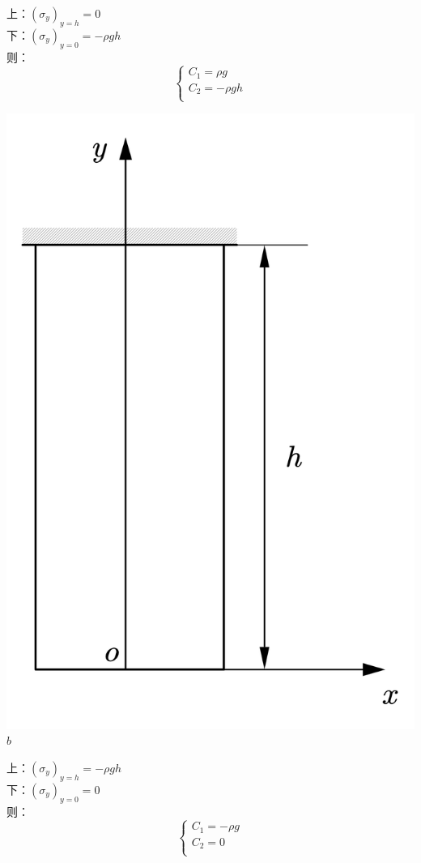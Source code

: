 \begin{center}
\begin{minipage}[c]{0.3\textwidth}
\begin{flushleft}
			上：$\left( \sigma _y \right) _{y=h}=0$\\
		下：$\left( \sigma _y \right) _{y=0}=-\rho gh$\\
		则：\[\begin{cases}
		C_1=\rho g\\
		C_2=-\rho gh\\
		\end{cases}\]
		\end{flushleft}
	\end{minipage}
\begin{minipage}[c]{0.3\textwidth}
	\centering
	\includegraphics[scale=0.3]{figure/2-6.png}\\
	$b$\\
	\begin{flushleft}
		上：$\left( \sigma _y \right) _{y=h}=-\rho gh$\\
	下：$\left( \sigma _y \right) _{y=0}=0$\\
	则：\[\begin{cases}
	C_1=-\rho g\\
	C_2=0\\
	\end{cases}\]
	\end{flushleft}
\end{minipage}
\end{center}

